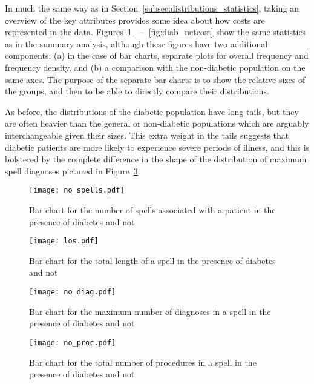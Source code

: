 In much the same way as in Section~\ref{subsec:distributions_statistics}, taking
an overview of the key attributes provides some idea about how costs are
represented in the data.
Figures~\ref{fig:diab_no_spells}~---~\ref{fig:diab_netcost} show
the same statistics as in the summary analysis, although these figures have two
additional components: (a) in the case of bar charts, separate plots for overall
frequency and frequency density, and (b) a comparison with the non-diabetic
population on the same axes. The purpose of the separate bar charts is to show
the relative sizes of the groups, and then to be able to directly compare their
distributions.

As before, the distributions of the diabetic population have long tails, but
they are often heavier than the general or non-diabetic populations which are
arguably interchangeable given their sizes. This extra weight in the tails
suggests that diabetic patients are more likely to experience severe periods of
illness, and this is bolstered by the complete difference in the shape of the
distribution of maximum spell diagnoses pictured in
Figure~\ref{fig:diab_no_diag}.

\begin{figure}
    \centering
    \texttt{[image: no\_spells.pdf]}
    \caption{%
        Bar chart for the number of spells associated with a patient in the
        presence of diabetes and not
    }\label{fig:diab_no_spells}
\end{figure}

\begin{figure}
    \centering
    \texttt{[image: los.pdf]}
    \caption{%
        Bar chart for the total length of a spell in the presence of diabetes
        and not
    }\label{fig:diab_los}
\end{figure}

\begin{figure}
    \centering
    \texttt{[image: no\_diag.pdf]}
    \caption{%
        Bar chart for the maximum number of diagnoses in a spell in the presence
        of diabetes and not
    }\label{fig:diab_no_diag}
\end{figure}

\begin{figure}
    \centering
    \texttt{[image: no\_proc.pdf]}
    \caption{%
        Bar chart for the total number of procedures in a spell in the presence
        of diabetes and not
    }\label{fig:diab_no_proc}
\end{figure}

